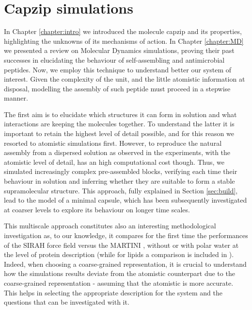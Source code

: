 \chapter{Capzip simulations} \label{chapter:capzip_results}

In Chapter \ref{chapter:intro} we introduced the molecule capzip and its properties, highlighting the unknowns of its mechanisms of action. In Chapter \ref{chapter:MD} we presented a review on Molecular Dynamics simulations, proving their past successes in elucidating the behaviour of self-assembling and antimicrobial peptides.
%
Now, we employ this technique to understand better our system of interest. Given the complexity of the unit, and the little atomistic information at disposal, modelling the assembly of such peptide must proceed in a stepwise manner.

The first aim is to elucidate which structures it can form in solution and what interactions are keeping the molecules together. To understand the latter it is important to retain the highest level of detail possible, and for this reason we resorted to atomistic simulations first.
%
However, to reproduce the natural assembly from a dispersed solution as observed in the experiments, with the atomistic level of detail, has an high computational cost though.
%
Thus, we simulated increasingly complex pre-assembled blocks, verifying each time their behaviour in solution and inferring whether they are suitable to form a stable supramolecular structure. This approach, fully explained in Section \ref{sec:build}, lead to the model of a minimal capsule, which has been subsequently investigated at coarser levels to explore its behaviour on longer time scales.

This multiscale approach constitutes also an interesting methodological investigation as, to our knowledge, it compares for the first time the performances of the SIRAH force field \citep{Machado2018,Barrera2019} versus the MARTINI \citep{Marrink2007, Monticelli2008}, without or with polar water \citep{Yesylevskyy2010} at the level of protein description (while for lipids a comparison is included in \citet{Barrera2019}). Indeed, when choosing a coarse-grained representation, it is crucial to understand how the simulations results deviate from the atomistic counterpart due to the coarse-grained representation - assuming that the atomistic is more accurate. This helps in selecting the appropriate description for the system and the questions that can be investigated with it.

